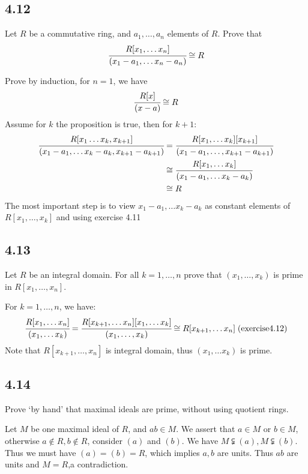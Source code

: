 \documentclass[a4paper, pdf, 12pt]{article}
\makeatletter
\renewenvironment{proof}[1][\proofname]{\par
  \pushQED{\qed}%
  \normalfont \topsep6\p@\@plus6\p@\relax
  \trivlist
  \item[%
    \hskip\labelsep
    \normalfont\bfseries %
    #1%
    \@addpunct{.}%
  ]\ignorespaces
}{%
  \popQED\endtrivlist\@endpefalse
}
\let\qed\relax %
\DeclareRobustCommand{\qed}{%
  \ifmmode \mathqed
  \else
    \leavevmode\unskip\penalty\@M\hbox{}\nobreak\hspace{.5em minus .1em}%
    \hbox{\qedsymbol}%
  \fi
}
\makeatother
\begin{document}
\subsection*{4.12}
Let $R$ be a commutative ring, and $a_1,\ldots, a_n$ elements of $R$. Prove that
$$
\cfrac{R[x_1,\ldots x_n]}{(x_1-a_1,\ldots x_n-a_n)}\cong R
$$
\begin{proof}
  Prove by induction, for $n=1$, we have $$
  \cfrac{R[x]}{(x-a)}\cong R
  $$
  Assume for $k$ the proposition is true, then for $k+1$:
  $$
  \begin{aligned}
  \cfrac{R[x_1\ldots x_k, x_{k+1}]}{(x_1-a_1,\ldots x_{k}-a_{k},x_{k+1}-a_{k+1})}&=
  \cfrac{R[x_1,\ldots x_{k}][x_{k+1}]}{(x_1-a_1,\ldots, x_{k+1}-a_{k+1})}\\
    &\cong \cfrac{R[x_1,\ldots x_{k}]}{(x_1-a_1,\ldots x_k-a_k)}\\
    &\cong R
  \end{aligned}
  $$
  The most important step is to view $x_1-a_1,\ldots x_k-a_k$ as constant elements of 
  $R[x_1,\ldots, x_k]$ and using exercise 4.11
\end{proof}

\subsection*{4.13}
Let $R$ be an integral domain. For all $k = 1,\ldots, n$ prove that $(x_1,\ldots, x_k)$
is prime in $R[x_1,\ldots, x_n]$.
\begin{proof}
  For $k=1,\ldots, n$, we have:
  $$
  \cfrac{R[x_1,\ldots x_n]}{(x_1,\ldots x_k)}=\cfrac{R[x_{k+1},\ldots x_{n}][x_1,\ldots x_k]}{(x_1,\ldots, x_k)}
  \cong R[x_{k+1},\ldots x_n]\;(\mbox{exercise4.12})
  $$
  Note that $R[x_{k+1}, \ldots, x_{n}]$ is integral domain, thus $(x_1,\ldots x_{k})$ is prime.
\end{proof}

\subsection*{4.14}
Prove ‘by hand’ that maximal ideals are prime, without using quotient rings.
\begin{proof}
  Let $M$ be one maximal ideal of $R$, and $ab\in M$. We assert that $a\in M$ or $b\in M$, otherwise
  $a\notin R, b\notin R$, consider $(a)$ and $(b)$. We have $M\subsetneqq (a), M\subsetneqq (b)$. Thus we
  must have $(a) = (b) = R$, which implies $a, b$ are units. Thus $ab$ are units and $M = R$,a contradiction.
\end{proof}
\end{document}
